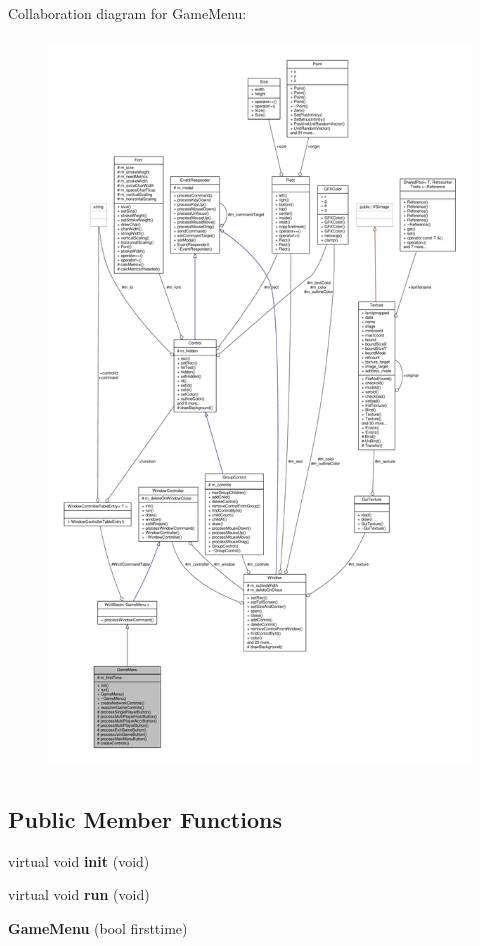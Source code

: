 Collaboration diagram for Game\+Menu\+:
\nopagebreak
\begin{figure}[H]
\begin{center}
\leavevmode
\includegraphics[height=550pt]{d5/d46/classGameMenu__coll__graph}
\end{center}
\end{figure}
\subsection*{Public Member Functions}
\begin{DoxyCompactItemize}
\item 
virtual void {\bfseries init} (void)\hypertarget{classGameMenu_a5dfdd1c9d883c2dd6850e798ab872adb}{}\label{classGameMenu_a5dfdd1c9d883c2dd6850e798ab872adb}

\item 
virtual void {\bfseries run} (void)\hypertarget{classGameMenu_aaa29413a8cfc6e10ebffdd2dd0868863}{}\label{classGameMenu_aaa29413a8cfc6e10ebffdd2dd0868863}

\item 
{\bfseries Game\+Menu} (bool firsttime)\hypertarget{classGameMenu_afeaafed7d997d76bcf4262bf80323810}{}\label{classGameMenu_afeaafed7d997d76bcf4262bf80323810}

\end{DoxyCompactItemize}
